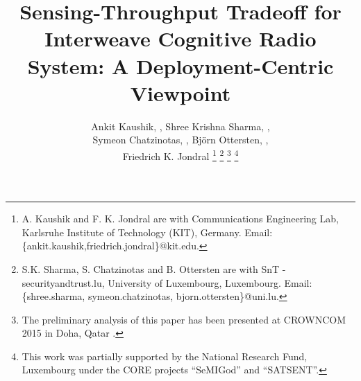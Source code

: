 \documentclass[journal, twocolumn]{IEEEtran}
\begin{document}
%
\title{Sensing-Throughput Tradeoff for Interweave Cognitive Radio System: A Deployment-Centric Viewpoint}
\author{Ankit Kaushik, , Shree Krishna Sharma,  ,\\  Symeon Chatzinotas, , Bj\"orn Ottersten, , \\ Friedrich K. Jondral  
\thanks{A. Kaushik and F. K. Jondral are with Communications Engineering Lab, Karlsruhe Institute of Technology (KIT), Germany. Email:{\{ankit.kaushik,friedrich.jondral\}@kit.edu.}} 
\thanks{S.K. Sharma, S. Chatzinotas and B. Ottersten are with SnT - securityandtrust.lu, University of Luxembourg, Luxembourg. Email:{\{shree.sharma, symeon.chatzinotas, bjorn.ottersten\}@uni.lu}.} 
\thanks{The preliminary analysis of this paper has been presented at CROWNCOM 2015 in Doha, Qatar \cite{Kaushik15_CC}.}
\thanks{This work was partially supported by the National Research Fund, Luxembourg under the CORE projects ``SeMIGod'' and ``SATSENT''.} 
}

\maketitle
\thispagestyle{empty}
\pagestyle{empty}





\end{document}
